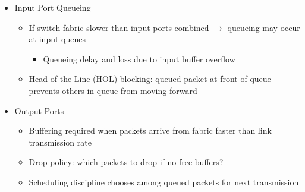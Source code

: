 \begin{itemize}
\begin{itemize}
\begin{itemize}
\begin{itemize}
            \end{itemize}

        \end{itemize}

    \end{itemize}

  \item Input Port Queueing

    \begin{itemize}

      \item If switch fabric slower than input ports combined $\to$ queueing may occur at input queues

        \begin{itemize}

          \item Queueing delay and loss due to input buffer overflow

        \end{itemize}

      \item Head-of-the-Line (HOL) blocking: queued packet at front of queue prevents others in queue from moving forward

    \end{itemize}

  \item Output Ports

    \begin{itemize}

      \item Buffering required when packets arrive from fabric faster than link transmission rate

      \item Drop policy: which packets to drop if no free buffers?

      \item Scheduling discipline chooses among queued packets for next transmission

    \end{itemize}

\end{itemize}




